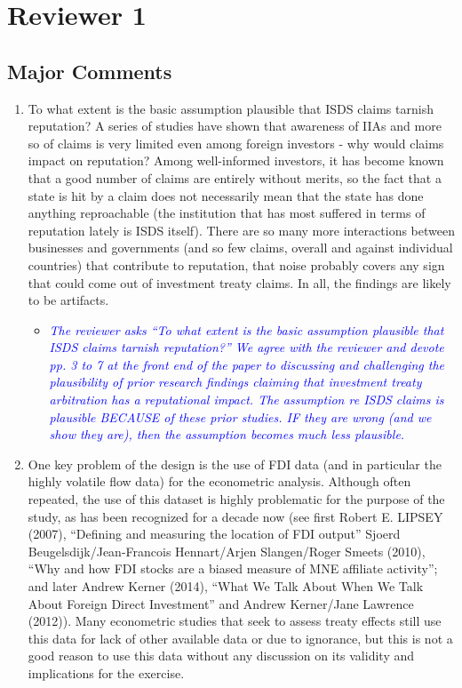 \section{Reviewer 1}

\subsection{Major Comments}

\begin{enumerate}
	\item To what extent is the basic assumption plausible that ISDS claims tarnish reputation? A series of studies have shown that awareness of IIAs and more so of claims is very limited even among foreign investors - why would claims impact on reputation? Among well-informed investors, it has become known that a good number of claims are entirely without merits, so the fact that a state is hit by a claim does not necessarily mean that the state has done anything reproachable (the institution that has most suffered in terms of reputation lately is ISDS itself). There are so many more interactions between businesses and governments (and so few claims, overall and against individual countries) that contribute to reputation, that noise probably covers any sign that could come out of investment treaty claims. In all, the findings are likely to be artifacts. 
	\begin{itemize}
		\item \textcolor{blue}{ \emph{
		The reviewer asks ``To what extent is the basic assumption plausible that ISDS claims tarnish reputation?'' We agree with the reviewer and devote pp. 3 to 7 at the front end of the paper to discussing and challenging the plausibility of prior research findings claiming that investment treaty arbitration has a reputational impact. The assumption re ISDS claims is plausible BECAUSE of these prior studies. IF they are wrong (and we show they are), then the assumption becomes much less plausible.
		}}
	\end{itemize}
	\item One key problem of the design is the use of FDI data (and in particular the highly volatile flow data) for the econometric analysis. Although often repeated, the use of this dataset is highly problematic for the purpose of the study, as has been recognized for a decade now (see first Robert E. LIPSEY (2007), ``Defining and measuring the location of FDI output'' Sjoerd Beugelsdijk/Jean-Francois Hennart/Arjen Slangen/Roger Smeets (2010), ``Why and how FDI stocks are a biased measure of MNE affiliate activity''; and later Andrew Kerner (2014), ``What We Talk About When We Talk About Foreign Direct Investment'' and Andrew Kerner/Jane Lawrence (2012)). Many econometric studies that seek to assess treaty effects still use this data for lack of other available data or due to ignorance, but this is not a good reason to use this data without any discussion on its validity and implications for the exercise. 

\end{enumerate}
